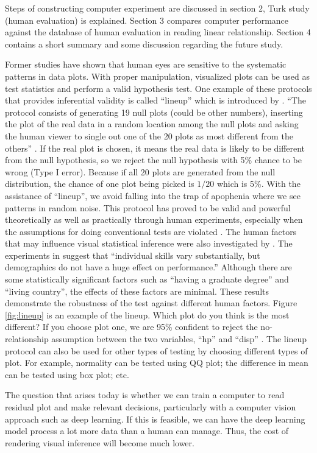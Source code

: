 \documentclass[12pt]{article}
\begin{document}
Steps of constructing computer experiment are discussed in section 2,
Turk study (human evaluation) is explained. Section 3 compares computer
performance against the database of human evaluation in reading linear
relationship. Section 4 contains a short summary and some discussion
regarding the future study.

Former studies have shown that human eyes are sensitive to the
systematic patterns in data plots. With proper manipulation, visualized
plots can be used as test statistics and perform a valid hypothesis
test. One example of these protocols that provides inferential validity
is called ``lineup'' which is introduced by \citet{HW10}. ``The protocol
consists of generating 19 null plots (could be other numbers), inserting
the plot of the real data in a random location among the null plots and
asking the human viewer to single out one of the 20 plots as most
different from the others'' \citep{HW10}. If the real plot is chosen, it
means the real data is likely to be different from the null hypothesis,
so we reject the null hypothesis with 5\% chance to be wrong (Type I
error). Because if all 20 plots are generated from the null
distribution, the chance of one plot being picked is \(1/20\) which is
5\%. With the assistance of ``lineup'', we avoid falling into the trap
of apophenia where we see patterns in random noise. This protocol has
proved to be valid and powerful theoretically as well as practically
through human experiments, especially when the assumptions for doing
conventional tests are violated \citep{MM13}. The human factors that may
influence visual statistical inference were also investigated by
\citet{human2014}. The experiments in \citet{human2014} suggest that
``individual skills vary substantially, but demographics do not have a
huge effect on performance.'' Although there are some statistically
significant factors such as ``having a graduate degree'' and ``living
country'', the effects of these factors are minimal. These results
demonstrate the robustness of the test against different human factors.
Figure \ref{fig:lineup} is an example of the lineup. Which plot do you
think is the most different? If you choose plot one, we are 95\%
confident to reject the no-relationship assumption between the two
variables, ``hp'' and ``disp'' \citep{SIM18}. The lineup protocol can
also be used for other types of testing by choosing different types of
plot. For example, normality can be tested using QQ plot; the difference
in mean can be tested using box plot; etc.

The question that arises today is whether we can train a computer to
read residual plot and make relevant decisions, particularly with a
computer vision approach such as deep learning. If this is feasible, we
can have the deep learning model process a lot more data than a human
can manage. Thus, the cost of rendering visual inference will become
much lower.
\end{document}
